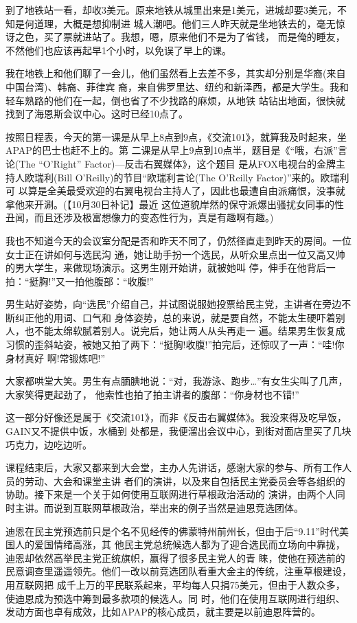 ﻿\documentclass[11pt]{article}
\begin{document}
到了地铁站一看，却收3美元。原来地铁从城里出来是1美元，进城却要3美元，不知是何道理，大概是想抑制进
城人潮吧。他们三人昨天就是坐地铁去的，毫无惊讶之色，买了票就进站了。我想，嗯，原来他们不是为了省钱，
而是俺的睡友，不然他们也应该再起早1个小时，以免误了早上的课。

我在地铁上和他们聊了一会儿，他们虽然看上去差不多，其实却分别是华裔(来自中国台湾)、韩裔、菲律宾
裔，来自佛罗里达、纽约和新泽西，都是大学生。我和轻车熟路的他们在一起，倒也省了不少找路的麻烦，从地铁
站钻出地面，很快就找到了海恩斯会议中心。这时已经10点了。

按照日程表，今天的第一课是从早上8点到9点，《交流101》，就算我及时起来，坐APAP的巴士也赶不上的。第
二课是从早上9点到10点半，题目是《``哦，右派''言论(The ``O'Right'' Factor)---反击右翼媒体》，这个题目
是从FOX电视台的金牌主持人欧瑞利(Bill O'Reilly)的节目``欧瑞利言论(The O'Reilly Factor)''来的。欧瑞利可
以算是全美最受欢迎的右翼电视台主持人了，因此也最遭自由派痛恨，没事就拿他来开涮。(【10月30日补记】最近
这位道貌岸然的保守派爆出骚扰女同事的性丑闻，而且还涉及极富想像力的变态性行为，真是有趣啊有趣。)

我也不知道今天的会议室分配是否和昨天不同了，仍然径直走到昨天的房间。一位女士正在讲如何与选民沟
通，她让助手扮一个选民，从听众里点出一位又高又帅的男大学生，来做现场演示。这男生刚开始讲，就被她叫
停，伸手在他背后一拍：``挺胸!''又一拍他腹部：``收腹!''

男生站好姿势，向``选民''介绍自己，并试图说服她投票给民主党，主讲者在旁边不断纠正他的用词、口气和
身体姿势，总的来说，就是要自然，不能太生硬吓着别人，也不能太绵软腻着别人。说完后，她让两人从头再走一
遍。结果男生恢复成习惯的歪斜站姿，被她又拍了两下：``挺胸!收腹!''拍完后，还惊叹了一声：``哇!你身材真好
啊!常锻炼吧!''

大家都哄堂大笑。男生有点腼腆地说：``对，我游泳、跑步\ldots ''有女生尖叫了几声，大家笑得更起劲了，
他索性也拍了拍主讲者的腹部：``你身材也不错!''

这一部分好像还是属于《交流101》，而非《反击右翼媒体》。我没来得及吃早饭，GAIN又不提供中饭，水桶到
处都是，我便溜出会议中心，到街对面店里买了几块巧克力，边吃边听。

课程结束后，大家又都来到大会堂，主办人先讲话，感谢大家的参与、所有工作人员的劳动、大会和课堂主讲
者们的演讲，以及来自包括民主党委员会等各组织的协助。接下来是一个关于如何使用互联网进行草根政治活动的
演讲，由两个人同时主讲。而说到互联网草根政治，举出来的例子当然是迪恩竞选团体。

迪恩在民主党预选前只是个名不见经传的佛蒙特州前州长，但由于后``9.11''时代美国人的爱国情绪高涨，其
他民主党总统候选人都为了迎合选民而立场向中靠拢，迪恩却依然高举民主党正统旗帜，赢得了很多民主党人的青
睐，使他在预选前的民意调查里遥遥领先。他们一改以前竞选团队看重大金主的传统，注重草根建设，用互联网把
成千上万的平民联系起来，平均每人只捐75美元，但由于人数众多，使迪恩成为预选中筹到最多款项的候选人。同
时，他们在使用互联网进行组织、发动方面也卓有成效，比如APAP的核心成员，就主要是以前迪恩阵营的。
\end{document}
